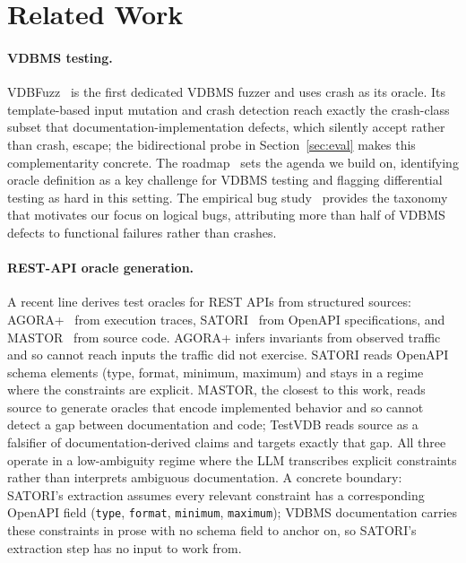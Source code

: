 \documentclass[sigconf]{acmart}
\begin{document}
\section{Related Work}
\label{sec:related}

\paragraph{VDBMS testing.}
VDBFuzz~\cite{vdbfuzz26} is the first dedicated VDBMS fuzzer and uses crash as its oracle. Its template-based input mutation and crash detection reach exactly the crash-class subset that documentation-implementation defects, which silently accept rather than crash, escape; the bidirectional probe in Section~\ref{sec:eval} makes this complementarity concrete. The roadmap~\cite{roadmap25} sets the agenda we build on, identifying oracle definition as a key challenge for VDBMS testing and flagging differential testing as hard in this setting. The empirical bug study~\cite{bugstudy25} provides the taxonomy that motivates our focus on logical bugs, attributing more than half of VDBMS defects to functional failures rather than crashes.

\paragraph{REST-API oracle generation.}
A recent line derives test oracles for REST APIs from structured sources: AGORA+~\cite{agoraplus25} from execution traces, SATORI~\cite{satori25} from OpenAPI specifications, and MASTOR~\cite{mastor26} from source code. AGORA+ infers invariants from observed traffic and so cannot reach inputs the traffic did not exercise. SATORI reads OpenAPI schema elements (type, format, minimum, maximum) and stays in a regime where the constraints are explicit. MASTOR, the closest to this work, reads source to generate oracles that encode implemented behavior and so cannot detect a gap between documentation and code; TestVDB reads source as a falsifier of documentation-derived claims and targets exactly that gap. All three operate in a low-ambiguity regime where the LLM transcribes explicit constraints rather than interprets ambiguous documentation. A concrete boundary: SATORI's extraction assumes every relevant constraint has a corresponding OpenAPI field (\texttt{type}, \texttt{format}, \texttt{minimum}, \texttt{maximum}); VDBMS documentation carries these constraints in prose with no schema field to anchor on, so SATORI's extraction step has no input to work from.
\end{document}
